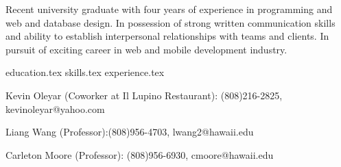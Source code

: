 \documentclass[11pt, a4paper]{awesome-cv}
\newcommand*{\sectiondir}{resume/}
\begin{document}
\makecvheader


Recent university graduate with four years of experience in programming and web and database design. In possession of strong written communication skills and ability to establish interpersonal relationships with teams and clients. In pursuit of exciting career in web and mobile development industry.


{education.tex}
{skills.tex}
{experience.tex}

\vspace{1em}
\begin{small}
\begin{cvitems}
\item{Kevin Oleyar (Coworker at Il Lupino Restaurant): (808)216-2825, kevinoleyar@yahoo.com}
\item{Liang Wang (Professor):(808)956-4703, lwang2@hawaii.edu}
\item{Carleton Moore (Professor): (808)956-6930, cmoore@hawaii.edu}	
\end{cvitems}
\end{small}
\end{document}

